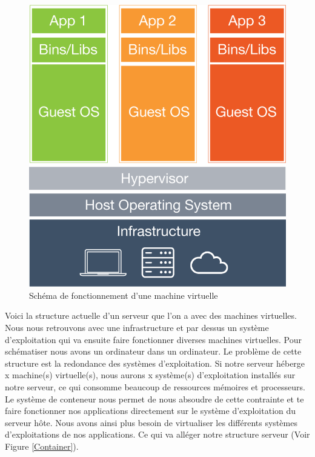       \begin{figure}
        \begin{center}
          \includegraphics[scale=0.2]{images/virtualMachine.png}
        \end{center}
        \caption{Schéma de fonctionnement d'une machine virtuelle}
        \label{Virtual Machine}
      \end{figure}

      Voici la structure actuelle d’un serveur que l’on a avec des machines virtuelles. Nous nous retrouvons avec une infrastructure et par dessus un système d’exploitation qui va ensuite faire fonctionner diverses machines virtuelles. Pour schématiser nous avons un ordinateur dans un ordinateur. Le problème de cette structure est la redondance des systèmes d’exploitation. Si notre serveur héberge x machine(s) virtuelle(s), nous aurons x système(s) d’exploitation installés sur notre serveur, ce qui consomme beaucoup de ressources mémoires et processeurs.\\

      Le système de conteneur nous permet de nous absoudre de cette contrainte et te faire fonctionner nos applications directement sur le système d’exploitation du serveur hôte. Nous avons ainsi plus besoin de virtualiser les différents systèmes d’exploitations de nos applications. Ce qui va alléger notre structure serveur (Voir Figure \ref{Container}).\\

